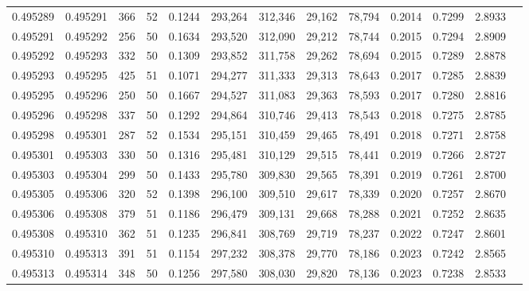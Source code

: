 \begin{tabular}{rrrrrrrrrrrrr}
0.495289 & 0.495291 &   366 &  52 &                                     0.1244 & 293,264 & 312,346 &  29,162 &  78,794 & 0.2014 & 0.7299 & 2.8933 \\
0.495291 & 0.495292 &   256 &  50 &                                     0.1634 & 293,520 & 312,090 &  29,212 &  78,744 & 0.2015 & 0.7294 & 2.8909 \\
0.495292 & 0.495293 &   332 &  50 &                                     0.1309 & 293,852 & 311,758 &  29,262 &  78,694 & 0.2015 & 0.7289 & 2.8878 \\
0.495293 & 0.495295 &   425 &  51 &                                     0.1071 & 294,277 & 311,333 &  29,313 &  78,643 & 0.2017 & 0.7285 & 2.8839 \\
0.495295 & 0.495296 &   250 &  50 &                                     0.1667 & 294,527 & 311,083 &  29,363 &  78,593 & 0.2017 & 0.7280 & 2.8816 \\
0.495296 & 0.495298 &   337 &  50 &                                     0.1292 & 294,864 & 310,746 &  29,413 &  78,543 & 0.2018 & 0.7275 & 2.8785 \\
0.495298 & 0.495301 &   287 &  52 &                                     0.1534 & 295,151 & 310,459 &  29,465 &  78,491 & 0.2018 & 0.7271 & 2.8758 \\
0.495301 & 0.495303 &   330 &  50 &                                     0.1316 & 295,481 & 310,129 &  29,515 &  78,441 & 0.2019 & 0.7266 & 2.8727 \\
0.495303 & 0.495304 &   299 &  50 &                                     0.1433 & 295,780 & 309,830 &  29,565 &  78,391 & 0.2019 & 0.7261 & 2.8700 \\
0.495305 & 0.495306 &   320 &  52 &                                     0.1398 & 296,100 & 309,510 &  29,617 &  78,339 & 0.2020 & 0.7257 & 2.8670 \\
0.495306 & 0.495308 &   379 &  51 &                                     0.1186 & 296,479 & 309,131 &  29,668 &  78,288 & 0.2021 & 0.7252 & 2.8635 \\
0.495308 & 0.495310 &   362 &  51 &                                     0.1235 & 296,841 & 308,769 &  29,719 &  78,237 & 0.2022 & 0.7247 & 2.8601 \\
0.495310 & 0.495313 &   391 &  51 &                                     0.1154 & 297,232 & 308,378 &  29,770 &  78,186 & 0.2023 & 0.7242 & 2.8565 \\
0.495313 & 0.495314 &   348 &  50 &                                     0.1256 & 297,580 & 308,030 &  29,820 &  78,136 & 0.2023 & 0.7238 & 2.8533 \\

\end{tabular}
